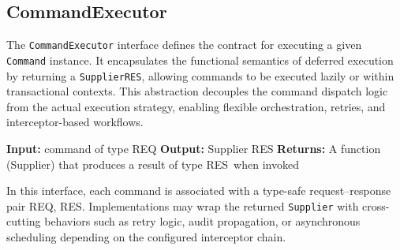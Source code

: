 \subsection{CommandExecutor}

The \texttt{CommandExecutor} interface defines the contract for executing
a given \texttt{Command} instance. It encapsulates the functional semantics
of deferred execution by returning a \texttt{Supplier\textlangle RES\textrangle},
allowing commands to be executed lazily or within transactional contexts.
This abstraction decouples the command dispatch logic from the actual
execution strategy, enabling flexible orchestration, retries, and
interceptor-based workflows.

\begin{algorithm}[H]
\caption{CommandExecutor (\emph{Interface})}
\begin{algorithmic}[1]
    \State \textbf{Input:} command of type \textlangle REQ\textrangle
    \State \textbf{Output:} Supplier \textlangle RES\textrangle
    \State \textbf{Returns:} A function (Supplier) that produces a result of type \textlangle RES\textrangle\ when invoked
\EndProcedure
\end{algorithmic}
\end{algorithm}

\noindent
In this interface, each command is associated with a type-safe request–response
pair \textlangle REQ, RES\textrangle. Implementations may wrap the returned
\texttt{Supplier} with cross-cutting behaviors such as retry logic, audit
propagation, or asynchronous scheduling depending on the configured interceptor chain.